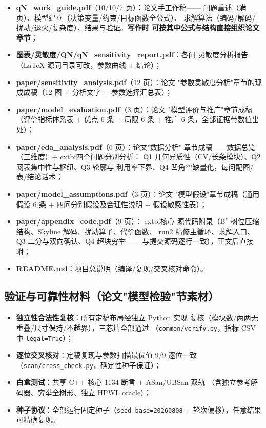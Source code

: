 \documentclass[12pt,a4paper]{article}
\begin{document}
\begin{itemize}
    \item \textbf{qN\_work\_guide.pdf}（10/10/7 页）：论文手工作稿——
    问题重述（满页）、模型建立（决策变量/约束/目标函数全公式）、
    求解算法（编码/解码/扰动/退火/复杂度）、结果与验证。\textbf{写作时
    可按其中公式与结构直接组织论文章节}；
    \item \textbf{图表/灵敏度/QN/qN\_sensitivity\_report.pdf}：各问
    灵敏度分析报告（LaTeX 源同目录可改，参数曲线 + 结论）；
    \item \textbf{paper/sensitivity\_analysis.pdf}（12 页）：论文
    "参数灵敏度分析"章节的现成成稿（12 图 + 分析文字 + 参数选择汇总表）；
    \item \textbf{paper/model\_evaluation.pdf}（3 页）：论文
    "模型评价与推广"章节成稿（评价指标体系表 + 优点 6 条 + 局限 6 条 +
    推广 6 条，全部证据带数值出处）；
    \item \textbf{paper/eda\_analysis.pdf}（6 页）：论文"数据分析"
    章节成稿——数据总览（三维度）+ 	extbf{四个问题分别分析}：
    Q1 几何异质性（CV/长条模块）、Q2 网表集中性与枢纽、Q3 轮廓与
    利用率下界、Q4 凹角空缺量化，每问配图/表/结论话术；
    \item \textbf{paper/model\_assumptions.pdf}（3 页）：论文
    "模型假设"章节成稿（通用假设 6 条 + 四问分别假设及合理性说明 +
    假设敏感性表）；
    \item \textbf{paper/appendix\_code.pdf}（9 页）：	extbf{核心
    源代码附录}（B$^*$ 树位压缩结构、Skyline 解码、扰动算子、代价函数、
    run2 精修主循环、求解入口、Q3 二分与双向确认、Q4 超块穷举——
    与提交源码逐行一致），正文后直接附；
    \item \textbf{README.md}：项目总说明（编译/复现/交叉核对命令）。
\end{itemize}

\subsection{验证与可靠性材料（论文"模型检验"节素材）}

\begin{itemize}
    \item \textbf{独立性合法性复核}：所有定稿布局经独立 Python 实现
    复核（模块数/两两无重叠/尺寸保持/不越界），三芯片全部通过
    （\texttt{common/verify.py}，指标 CSV 中 \texttt{legal=True}）；
    \item \textbf{逐位交叉核对}：定稿复现与参数扫描最优值 9/9 逐位一致
    （\texttt{scan/cross\_check.py}，确定性种子保证）；
    \item \textbf{白盒测试}：共享 C++ 核心 1134 断言 + ASan/UBSan 双轨
    （含独立参考解码器、穷举全树形、独立 HPWL oracle）；
    \item \textbf{种子协议}：全部运行固定种子（\texttt{seed\_base=20260808}
    + 轮次偏移），任意结果可精确复现。
\end{itemize}
\end{document}
